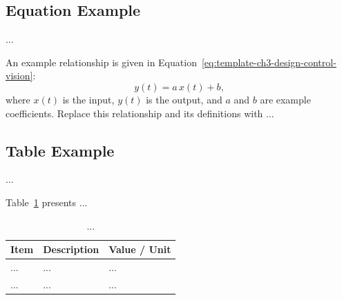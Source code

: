 \subsection{Equation Example}
...

An example relationship is given in Equation~\eqref{eq:template-ch3-design-control-vision}:
\begin{equation}
    y(t) = a\,x(t) + b,
    \label{eq:template-ch3-design-control-vision}
\end{equation}
where $x(t)$ is the input, $y(t)$ is the output, and $a$ and $b$ are
example coefficients. Replace this relationship and its definitions with ...

\subsection{Table Example}
...

Table~\ref{tab:template-ch3-design-control-vision} presents ...
\begin{table}[htbp]
    \centering
    \caption{...}
    \label{tab:template-ch3-design-control-vision}
    \begin{tabularx}{0.9\linewidth}{lXX}
        \toprule
        \textbf{Item} & \textbf{Description} & \textbf{Value / Unit} \\
        \midrule
        ... & ... & ... \\
        ... & ... & ... \\
        \bottomrule
    \end{tabularx}
\end{table}
